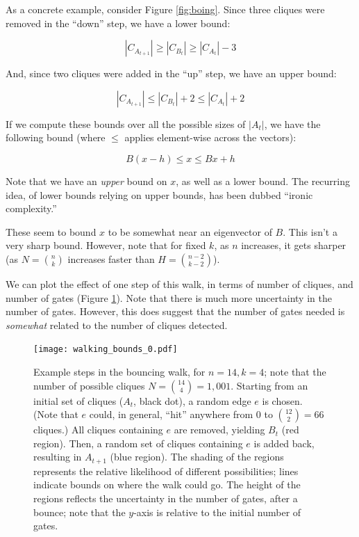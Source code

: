 \documentclass[12pt]{article}
\theoremstyle{definition}
\begin{document}
As a concrete example, consider Figure \ref{fig:boing}. Since three cliques were removed in the ``down''
step, we have a lower bound:

\[
|C_{A_{t+1}}| \ge |C_{B_t}| \ge |C_{A_t}| - 3
\]

And, since two cliques were added in the ``up'' step, we have an upper bound:

\[
|C_{A_{t+1}}| \le |C_{B_t}| + 2 \le |C_{A_t}| + 2
\]

If we compute these bounds over all the possible sizes of $|A_t|$, 
we have the following bound (where $\le$ applies element-wise across the vectors):

\begin{equation}
\label{eq:stepBound}
B(x - h) \le x \le Bx + h
\end{equation}

Note that we have an {\em upper} bound on $x$, as well
as a lower bound.
The recurring idea, of lower bounds relying on upper bounds,
has been dubbed ``ironic complexity.''
\cite{aaronson_pnp}

These seem to bound $x$ to be somewhat near an eigenvector of $B$. This isn't a very sharp bound.
However, note that for fixed $k$, as $n$ increases, it gets sharper (as $N = {n \choose k}$ increases faster than $H = {{n-2} \choose {k-2}}$).

We can plot the effect of one step of this walk, in terms of number of cliques, and number of gates (Figure \ref{fig:walk}).
Note that there is much more uncertainty in the number of gates. However, this does suggest that the
number of gates needed is {\em somewhat} related to the number of cliques detected.

\begin{figure}

\centering

\texttt{[image: walking\_bounds\_0.pdf]}

\caption{
Example steps in the bouncing walk, for $n=14, k=4$; 
note that the number of possible cliques $N = {14 \choose 4} = 1,001$.
 Starting from an initial set of cliques ($A_t$, black dot),
a random edge $e$ is chosen. (Note that $e$ could, in general,
``hit'' anywhere from 0 to ${12 \choose 2} = 66$ cliques.)
 All cliques containing $e$ are removed, yielding $B_t$ (red region).
Then, a random set of cliques containing $e$ is added back, resulting in $A_{t+1}$ (blue region).
The shading of the regions represents the relative likelihood of different possibilities;
lines indicate bounds on where the walk could go.
The height of the regions reflects the uncertainty in the number
of gates, after a bounce; note that the $y$-axis is relative to the initial number of gates.
}
\label{fig:walk}

\end{figure}
\end{document}
